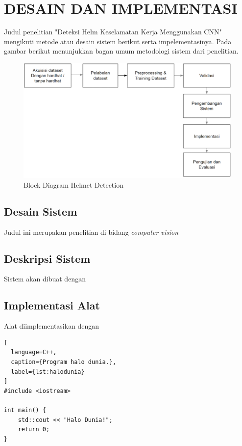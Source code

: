 \chapter{DESAIN DAN IMPLEMENTASI}
\label{chap:desainimplementasi}

Judul penelitian "Deteksi Helm Keselamatan Kerja Menggunakan CNN" mengikuti metode atau desain sistem berikut serta impelementasinya.
Pada gambar berikut menunjukkan bagan umum metodologi sistem dari penelitian.

\begin{figure}[ht]
  \centering
  \includegraphics{gambar/blockdiagram-helmetdetection.png}
  \caption{Block Diagram Helmet Detection}
  \label{fig:helmetdetectiondiagram}
\end{figure}

\section{Desain Sistem}
\par Judul ini merupakan penelitian di bidang \emph{computer vision} 


\section{Deskripsi Sistem}
\label{sec:deskripsisistem}

Sistem akan dibuat dengan \lipsum[1-2]

\section{Implementasi Alat
\label{sec:implementasi alat}}

Alat diimplementasikan dengan \lipsum[1]

\begin{lstlisting}[
  language=C++,
  caption={Program halo dunia.},
  label={lst:halodunia}
]
#include <iostream>

int main() {
    std::cout << "Halo Dunia!";
    return 0;
}
\end{lstlisting}

\lipsum[2-3]



\lipsum[4]
